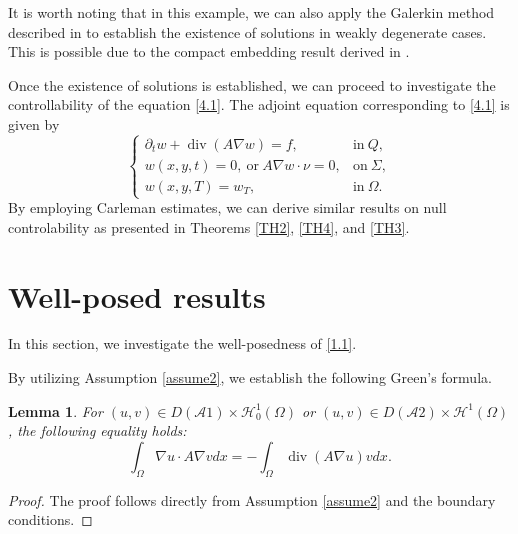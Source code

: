 \documentclass[9pt,reqno]{amsart}
\theoremstyle{plain}
\newtheorem{lemma}[theorem]{Lemma}
\numberwithin{equation}{section}
\numberwithin{theorem}{section}
\def\Om{\Omega}
\DeclareMathOperator*{\Div}{\mathrm{div}}
\def\Om{\Omega}
\def\mcH{\mathcal{H}}
\begin{document}
	It is worth noting that in this example, we can also apply the Galerkin method described in \cite{EVANS} to establish the existence of solutions in weakly degenerate cases. This is possible due to the compact embedding result derived in \cite{sun2023extremal}.
	
	Once the existence of solutions is established, we can proceed to investigate the controllability of the equation \eqref{4.1}. The adjoint equation corresponding to \eqref{4.1} is given by
	\begin{equation}\label{adjoint}
		\begin{cases}
			\partial_{t}w + \Div(A\nabla w)=f, & \mbox{in} \ Q,  \\
			w(x,y,t)=0, \ \mbox{or} \ A\nabla w \cdot \nu =0, & \mbox{on} \ \Sigma,  \\
			w(x,  y,  T)= w_T,  & \mbox{in} \ \Omega.  
		\end{cases}
	\end{equation}
	By employing Carleman estimates, we can derive similar results on null controlability as presented in Theorems \ref{TH2}, \ref{TH4}, and \ref{TH3}.
	
	
	\section{Well-posed results}
	In this section, we investigate the well-posedness of \eqref{1.1}.
	
	By utilizing Assumption \ref{assume2}, we establish the following Green's formula.
	\begin{lemma}\label{div}
		For $(u,v)\in D(\mathcal{A}1)\times \mcH^1_0(\Omega)$ or $(u,v)\in D(\mathcal{A}2)\times \mcH^1(\Omega)$, the following equality holds:
		\begin{equation*}
			\int_\Om \nabla u \cdot A \nabla v dx = -\int_\Om \Div (A \nabla u) vdx.
		\end{equation*}
	\end{lemma}
	\begin{proof}
		The proof follows directly from Assumption \ref{assume2} and the boundary conditions.
	\end{proof}
	
\end{document}
